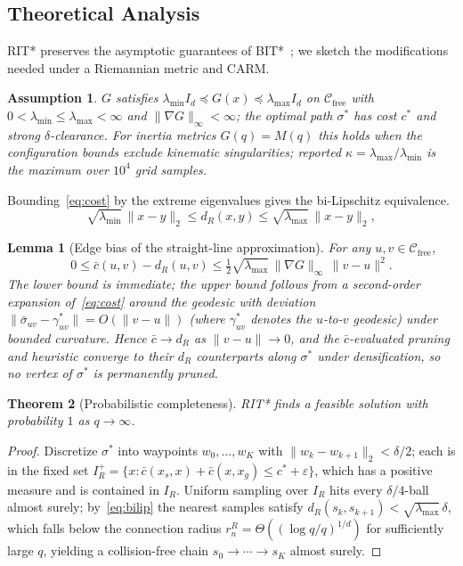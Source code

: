 \documentclass[journal]{IEEEtran}
\newcommand{\revB}[1]{#1}%
\newtheorem{theorem}{Theorem}
\newtheorem{lemma}[theorem]{Lemma}
\newtheorem{assumption}{Assumption}
\newcommand{\Cfree}{\mathcal{C}_{\mathrm{free}}}
\newcommand{\IR}{I_{\!R}}
\newcommand{\dR}{d_{\!R}}
\begin{document}
\subsection{Theoretical Analysis}\label{sec:analysis}
 
RIT* preserves the asymptotic guarantees of BIT*~\cite{Gammell2020}; we sketch the modifications needed under a Riemannian metric and CARM.
 
\begin{assumption}\label{assum:bounded}
$G$ satisfies $\lambda_{\min}I_d \preceq G(x) \preceq \lambda_{\max}I_d$ on $\Cfree$ with $0<\lambda_{\min}\le\lambda_{\max}<\infty$ and $\|\nabla G\|_\infty<\infty$; the optimal path $\sigma^*$ has cost $c^*$ and strong $\delta$-clearance. For inertia metrics $G(q)=M(q)$ this holds when the configuration bounds exclude kinematic singularities; reported $\kappa=\lambda_{\max}/\lambda_{\min}$ is the maximum over $10^4$ grid samples.
\end{assumption}
 
Bounding~\eqref{eq:cost} by the extreme eigenvalues gives the bi-Lipschitz equivalence.
\begin{equation}\label{eq:bilip}
\sqrt{\lambda_{\min}}\,\|x-y\|_2 \le \dR(x,y) \le \sqrt{\lambda_{\max}}\,\|x-y\|_2,
\end{equation}

 
\begin{lemma}[Edge bias of the straight-line approximation]\label{lem:edgebias}
For any $u,v\in\Cfree$,
\begin{equation}\label{eq:edgebias}
0 \le \bar c(u,v) - \dR(u,v) \le \tfrac{1}{2}\sqrt{\lambda_{\max}}\,\|\nabla G\|_\infty\,\|v-u\|^2.
\end{equation}
The lower bound is immediate; the upper bound follows from a second-order expansion of~\eqref{eq:cost} around the geodesic with deviation \revB{$\|\bar\sigma_{uv}-\gamma_{uv}^*\|=O(\|v-u\|)$ (where $\gamma_{uv}^*$ denotes the $u$-to-$v$ geodesic)} under bounded curvature. Hence $\bar c\to\dR$ as $\|v-u\|\to 0$, and the $\bar c$-evaluated pruning and heuristic converge to their $\dR$ counterparts along $\sigma^*$ under densification, so no vertex of $\sigma^*$ is permanently pruned.
\end{lemma}
 
\begin{theorem}[Probabilistic completeness]\label{thm:complete}
RIT* finds a feasible solution with probability $1$ as $q\to\infty$.
\end{theorem}
\begin{proof}
\revB{Discretize} $\sigma^*$ into waypoints $w_0,\ldots,w_K$ with $\|w_k-w_{k+1}\|_2<\delta/2$; each is in the fixed set $\IR^{+}=\{x:\bar c(x_s,x)+\bar c(x,x_g)\le c^*+\varepsilon\}$, which has a positive measure and is contained in $\IR$. Uniform sampling over $\IR$ hits every $\delta/4$-ball almost surely; by~\eqref{eq:bilip} the nearest samples satisfy $\dR(s_k,s_{k+1})<\sqrt{\lambda_{\max}}\,\delta$, which falls below the connection radius $r_n^R=\Theta((\log q/q)^{1/d})$ for sufficiently large $q$, yielding a collision-free chain $s_0\!\to\!\cdots\!\to\! s_K$ almost surely.
\end{proof}
 
\end{document}
